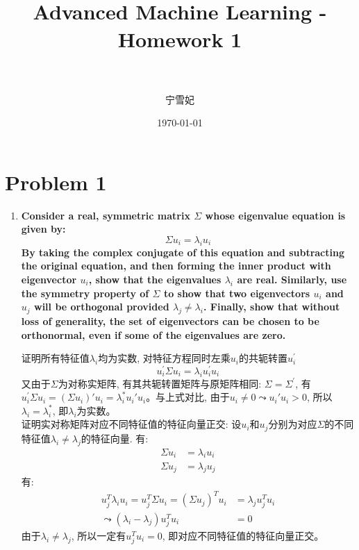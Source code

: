 \documentclass[paper=a4, fontsize=11pt]{scrartcl} %
\title{	
\normalfont \normalsize 
\horrule{0.5pt} \\[0.4cm] %
\huge Advanced Machine Learning - Homework 1\\ %
\horrule{2pt} \\[0.5cm] %
}
\author{宁雪妃} %
\date{\normalsize\today} %
\numberwithin{equation}{section} %
\numberwithin{figure}{section} %
\numberwithin{table}{section} %
\begin{document}
\maketitle %

\section{Problem 1}
\begin{enumerate}[a]
\item \textbf{Consider a real, symmetric matrix $\Sigma$ whose eigenvalue equation is given by:}
  \[
  \Sigma u_i = \lambda_i u_i
  \]
  \textbf{By taking the complex conjugate of this equation and subtracting the original equation, and then forming the inner product with eigenvector $u_i$, show that the eigenvalues $\lambda_i$ are real. Similarly, use the symmetry property of $\Sigma$ to show that two eigenvectors $u_i$ and $u_j$ will be orthogonal provided $\lambda_j \neq \lambda_i$. Finally, show that without loss of generality, the set of eigenvectors can be chosen to be orthonormal, even if some of the eigenvalues are zero.}

  证明所有特征值$\lambda_i$均为实数, 对特征方程同时左乘$u_i$的共轭转置$u_i^{'}$
  \[
  u_i^{'} \Sigma u_i = \lambda_i u_i^{'} u_i
  \]
  又由于$\Sigma$为对称实矩阵, 有其共轭转置矩阵与原矩阵相同: $\Sigma = \Sigma^{'}$, 有$u_i^{'} \Sigma u_i = (\Sigma u_i)' u_i = \lambda_i^{*} u_i' u_i$。与上式对比, 由于$u_i \neq 0 \leadsto u_i' u_i > 0$, 所以$\lambda_i = \lambda_i^{*}$, 即$\lambda_i$为实数。\\

  证明实对称矩阵对应不同特征值的特征向量正交: 设$u_i$和$u_j$分别为对应$\Sigma$的不同特征值$\lambda_i \neq \lambda_j$的特征向量. 有:
  \begin{equation}
  \begin{split}
    \Sigma u_i & = \lambda_i u_i \\
    \Sigma u_j & = \lambda_j u_j
  \end{split}
  \end{equation}
  有:
  \begin{equation}
  \begin{split}
    u_j^T \lambda_i u_i = u_j^T \Sigma u_i = {(\Sigma u_j)}^T u_i & = \lambda_j u_j^T u_i \\
    \leadsto (\lambda_i - \lambda_j) u_j^T u_i & = 0
  \end{split}
  \end{equation}
  由于$\lambda_i \neq \lambda_j$, 所以一定有$u_j^T u_i = 0$, 即对应不同特征值的特征向量正交。\\


\end{enumerate}
\end{document}

